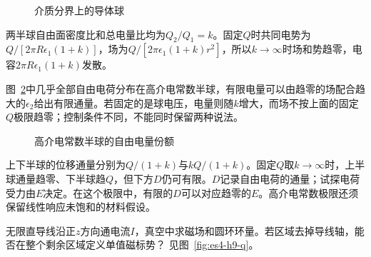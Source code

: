 \begin{figure}[H]\centering
{}
\caption{介质分界上的导体球}\label{fig:es4-h8-q}
\end{figure}
\begin{solution}
两半球自由面密度比和总电量比均为$Q_2/Q_1=k$。固定$Q$时共同电势为$Q/[2\pi R\epsilon_1(1+k)]$，场为$Q/[2\pi\epsilon_1(1+k)r^2]$，所以$k\to\infty$时场和势趋零，电容$2\pi R\epsilon_1(1+k)$发散。

图~\ref{fig:es4-h8-s}中几乎全部自由电荷分布在高介电常数半球，有限电量可以由趋零的场配合趋大的$\epsilon_2$给出有限通量。若固定的是球电压，电量则随$k$增大，而场不按上面的固定$Q$极限趋零；控制条件不同，不能同时保留两种说法。
\begin{figure}[H]\centering
{}
\caption{高介电常数半球的自由电量份额}\label{fig:es4-h8-s}
\end{figure}


上下半球的位移通量分别为$Q/(1+k)$与$kQ/(1+k)$。固定$Q$取$k\to\infty$时，上半球通量趋零、下半球趋$Q$，但下方$D$仍可有限。$D$记录自由电荷的通量；试探电荷受力由$E$决定。在这个极限中，有限的$D$可以对应趋零的$E$。高介电常数极限还须保留线性响应未饱和的材料假设。
\end{solution}

\begin{exercise}[无限直导线的环量方向]\label{ex:es4-h9}
无限直导线沿正$z$方向通电流$I$，真空中求磁场和圆环环量。若区域去掉导线轴，能否在整个剩余区域定义单值磁标势？ 见图~\ref{fig:es4-h9-q}。
\end{exercise}

